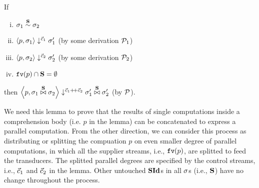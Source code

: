 \begin{lem}  \label{lem-sgm-join}
	If 
	\begin{enumerate}[(i)]
		\item $\sgm_1 \~{\S} \sgm_2$
		\item $\seval{p}{\sgm_1}{\c_1}{\sgm_1'}$ (by some derivation $\MP_1$)
		\item $	\seval{p}{\sgm_2} {\c_2} {\sgm_2'}$ (by some derivation $\MP_2$)
		\item $\FV{p} \cap \S = \emptyset $
	\end{enumerate}
	then $\seval{p}{\sgm_1 \x\S \sgm_2}{\c_1 {\++} \c_2}{ \sgm_1' \x\S \sgm_2' }$ (by $\MP$).
\end{lem}

We need this lemma to prove that the results of single computations inside a comprehension body (i.e. $p$ in the lemma) can be concatenated to express a parallel computation. From the other direction, we can consider this process as distributing or splitting the compuation $p$ on even smaller degree of parallel computations, in which all the supplier streams, i.e., $\FV{p}$, are splitted to
feed the transducers. The splitted parallel degrees are specified by the
control streams, i.e., $\c_1$ and $\c_2$ in the lemma. Other untouched $\SId$s in all $\sgm$s (i.e., $\S$) have no change throughout the process.\\

